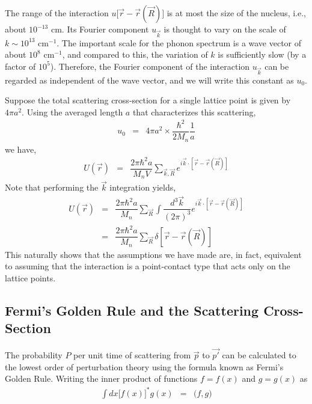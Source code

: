 \documentclass[a4j]{jsarticle}
\begin{document}
The range of the interaction $u \big[ \vec{r} - \vec{r}(\vec{R}) \big]$ is
at most the size of the nucleus, i.e., about $10^{-13}$ cm.
Its Fourier component $u_{\vec{k}}$ is thought to vary on the scale of $k \sim 10^{13}$ cm$^{-1}$.
The important scale for the phonon spectrum is a wave vector of about $10^{8}$ cm$^{-1}$,
and compared to this, the variation of $k$ is sufficiently slow (by a factor of $10^5$).
Therefore, the Fourier component of the interaction $u_{\vec{k}}$ can be regarded as independent of the wave vector,
and we will write this constant as $u_{0}$.

Suppose the total scattering cross-section for a single lattice point is given by $4 \pi a^{2}$.
Using the averaged length $a$ that characterizes this scattering,
\begin{eqnarray}
	u_{0}
	&=&
	4 \pi a^{2} \times \dfrac{\hbar^{2}}{2M_{n}} \dfrac{1}{a}
\end{eqnarray}
we have,
\begin{eqnarray}
	U(\vec{r})
	&=&
	\dfrac{ 2 \pi \hbar^{2} a }{ M_{n} V }
	\sum_{ \vec{k} , \vec{R} }
	e^{i \vec{k} \cdot [ \vec{r} - \vec{r}(\vec{R}) ] }
\end{eqnarray}
Note that performing the $\vec{k}$ integration yields,
\begin{eqnarray}
	U(\vec{r})
	&=&
	\dfrac{ 2 \pi \hbar^{2} a }{ M_{n} }
	\sum_{ \vec{R} }
	\int \dfrac{d^{3} \vec{k}}{(2 \pi)^{3}}
	e^{i \vec{k} \cdot [ \vec{r} - \vec{r}(\vec{R}) ] }
	\nonumber \\[3mm] &=&
	\dfrac{ 2 \pi \hbar^{2} a }{ M_{n} }
	\sum_{ \vec{R} }
	\delta [ \vec{r} - \vec{r}(\vec{R}) ]
\end{eqnarray}
This naturally shows that the assumptions we have made are,
in fact, equivalent to assuming that the interaction is a point-contact type that acts only on the lattice points.

\subsection*{Fermi's Golden Rule and the Scattering Cross-Section}

The probability $P$ per unit time of scattering from $\vec{p}$ to $\vec{p'}$ can be calculated
to the lowest order of perturbation theory using the formula known as Fermi's Golden Rule.
Writing the inner product of functions $f=f(x)$ and $g=g(x)$ as
\begin{eqnarray}
	\int dx \big[ f(x) \big]^{*} g(x)
	&=&
	\big( f , g \big)
\end{eqnarray}
\end{document}
